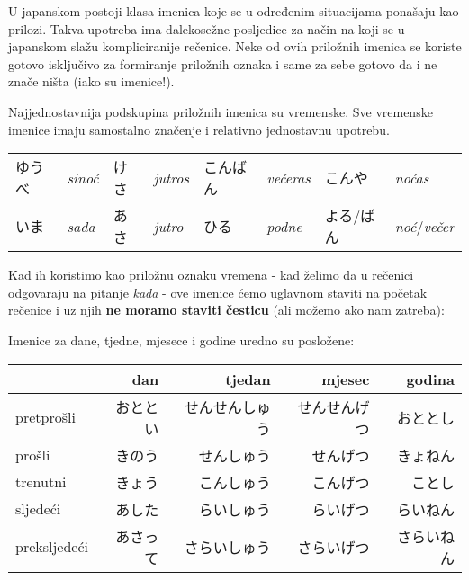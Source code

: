 
\newpage
{}

	
	
	U japanskom postoji klasa imenica koje se u određenim situacijama ponašaju kao prilozi. Takva upotreba ima dalekosežne posljedice za način na koji se u japanskom slažu kompliciranije rečenice. Neke od ovih priložnih imenica se koriste gotovo isključivo za formiranje priložnih oznaka i same za sebe gotovo da i ne znače ništa (iako su imenice!).
	
	Najjednostavnija podskupina priložnih imenica su vremenske. Sve vremenske imenice imaju samostalno značenje i relativno jednostavnu upotrebu.
	
	
	\begin{tabular}{l l l l l l l l}
		ゆうべ & \textit{sinoć} & けさ & \textit{jutros} & こんばん & \textit{večeras} & こんや & \textit{noćas}\\
 		いま & \textit{sada} & あさ & \textit{jutro} & ひる & \textit{podne} & よる/ばん & \textit{noć}/\textit{večer}\\
	\end{tabular}

	\vspace{10pt}
	Kad ih koristimo kao priložnu oznaku vremena - kad želimo da u rečenici odgovaraju na pitanje \textit{kada} - ove imenice ćemo uglavnom staviti na početak rečenice i uz njih \textbf{ne moramo staviti česticu} (ali možemo ako nam zatreba):
	
	\begin{reibun}
	\end{reibun}

	Imenice za dane, tjedne, mjesece i godine uredno su posložene:
	
	\begin{table}[h]
		\centering
		\begin{tabular}{l r r r r}\toprule[2pt]
			& dan & tjedan & mjesec & godina \\
			\midrule
			pretprošli 		& おととい & せんせんしゅう & せんせんげつ & おととし \\
			prošli 			& きのう & せんしゅう & せんげつ & きょねん \\
			trenutni 		& きょう & こんしゅう & こんげつ & ことし \\
			sljedeći 		& あした & らいしゅう & らいげつ & らいねん \\
			preksljedeći 	& あさって & さらいしゅう & さらいげつ & さらいねん \\
			\bottomrule[2pt]
		\end{tabular}
	\end{table}
	
